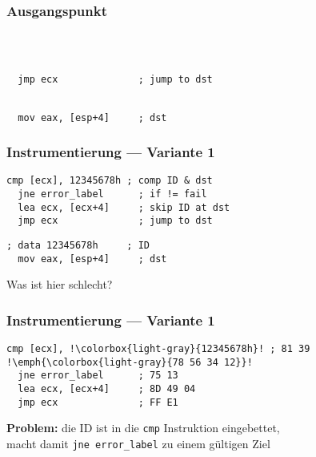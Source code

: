 \documentclass[mathserif,slidestop,compress,red]{beamer}
\begin{document}
\begin{frame}[fragile]
  \frametitle{Ausgangspunkt}
  \begin{lstlisting}[title=Quelle]



  jmp ecx              ; jump to dst
  \end{lstlisting}
  \begin{lstlisting}[title=Ziel]

  mov eax, [esp+4]     ; dst
  \end{lstlisting}
\end{frame}

\begin{frame}[fragile]
  \frametitle{Instrumentierung — Variante 1}
  \begin{lstlisting}[title=Quelle]
  cmp [ecx], 12345678h ; comp ID & dst
  jne error_label      ; if != fail
  lea ecx, [ecx+4]     ; skip ID at dst
  jmp ecx              ; jump to dst
  \end{lstlisting}
  \begin{lstlisting}[title=Ziel]
  ; data 12345678h     ; ID
  mov eax, [esp+4]     ; dst
  \end{lstlisting}
  \pause
  \begin{flushright}
    Was ist hier schlecht?
  \end{flushright}
\end{frame}


\begin{frame}[fragile]
  \frametitle{Instrumentierung — Variante 1}
  \begin{lstlisting}[title=Quelle,escapechar=!]
  cmp [ecx], !\colorbox{light-gray}{12345678h}! ; 81 39 !\emph{\colorbox{light-gray}{78 56 34 12}}!
  jne error_label      ; 75 13
  lea ecx, [ecx+4]     ; 8D 49 04
  jmp ecx              ; FF E1
  \end{lstlisting}
  \textbf{Problem:} die ID ist in die \texttt{cmp} Instruktion eingebettet, \\ macht
  damit \texttt{jne error\_label} zu einem gültigen Ziel
\end{frame}
\end{document}
